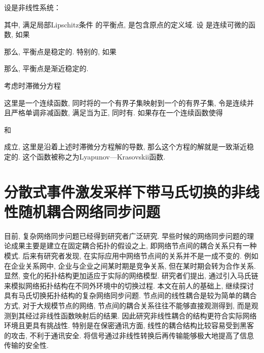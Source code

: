     \begin{lem}[Lyapunov稳定性定理]\label{lem:lyapunov}
        设是非线性系统：
        \begin{comment}
          \dot{x}=f(x), \quad f(0)=0
        \end{comment}
        其中, 满足局部{\rm{Lipschitz}}条件
        的平衡点, 是包含原点的定义域. 设
        是连续可微的函数, 如果
        \begin{comment}
          &V(0)=0;\\
          &V(x)>0,\quad x \in D-\{0\};\\
          &\dot{V}(x) \leq 0,\quad x \in D;
        \end{comment}
        那么, 平衡点是稳定的. 特别的, 如果

         那么, 平衡点是渐近稳定的.
    \end{lem}
\begin{lem}\label{lem:lyapunov}
考虑时滞微分方程
\begin{comment}
    \dot{x}(t)=f(t,x(t))
\end{comment}
这里是一个连续函数, 同时将的一个有界子集映射到一个的有界子集, 令是连续并且严格单调非减函数, 满足当为正, 同时有. 如果存在一个连续函数使得

和

成立, 这里是沿着上述时滞微分方程解的导数, 那么这个方程的解就是一致渐近稳定的. 这个函数被称之为{\rm{Lyapunov—Krasovskii}}函数.
\end{lem}
\chapter{分散式事件激发采样下带马氏切换的非线性随机耦合网络同步问题}\label{chapternonline}
    目前, 复杂网络同步问题已经得到研究者广泛研究. 早些时候的网络同步问题的理论成果主要是建立在固定耦合拓扑的假设之上, 即网络节点间的耦合关系只有一种模式. 后来有研究者发现, 在实际应用中网络节点间的关系并不是一成不变的. 例如在企业关系网中, 企业与企业之间某时期是竞争关系, 但在某时期会转为合作关系. 显然, 变化的拓扑结构更加适应于实际的网络模型. 研究者们提出, 通过引入马氏链来模拟网络拓扑结构在不同外环境中的切换过程. 本文在前人的基础上, 继续探讨具有马氏切换拓扑结构的复杂网络同步问题.
    节点间的线性耦合是较为简单的耦合方式, 对于大规模节点的网络, 节点间的耦合关系往往不能够直接观测得到, 而是观测到其经过非线性函数映射后的结果. 因此研究非线性耦合的结构更符合实际网络环境且更具有挑战性. 特别是在保密通讯方面, 线性的耦合结构比较容易受到黑客的攻击, 不利于通讯安全. 将信号通过非线性转换后再传输能够极大地提高了信息传输的安全性.

